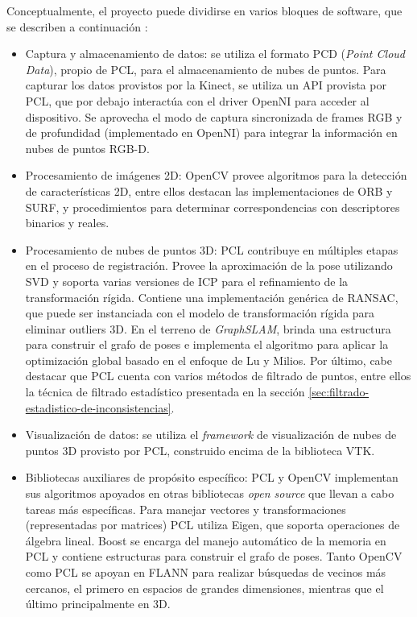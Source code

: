 Conceptualmente, el proyecto puede dividirse en varios bloques de software, que se describen a continuación :
\begin{itemize}

\item Captura y almacenamiento de datos: se utiliza el formato PCD (\textit{Point Cloud Data}), propio de PCL, para el almacenamiento de nubes de puntos. Para capturar los datos provistos por la Kinect, se utiliza un API provista por PCL, que por debajo interactúa con el driver OpenNI para acceder al dispositivo. Se aprovecha el modo de captura sincronizada de frames RGB y de profundidad (implementado en OpenNI) para integrar la información en nubes de puntos RGB-D.

\item Procesamiento de imágenes 2D: OpenCV provee algoritmos para la detección de características 2D, entre ellos destacan las implementaciones de ORB y SURF, y procedimientos para determinar correspondencias con descriptores binarios y reales.

\item Procesamiento de nubes de puntos 3D: PCL contribuye en múltiples etapas en el proceso de registración. Provee la aproximación de la pose utilizando SVD y soporta varias versiones de ICP para el refinamiento de la transformación rígida. Contiene una implementación genérica de RANSAC, que puede ser instanciada con el modelo de transformación rígida para eliminar outliers 3D. En el terreno de \textit{GraphSLAM}, brinda una estructura para construir el grafo de poses e implementa el algoritmo para aplicar la optimización global basado en el enfoque de Lu y Milios. Por último, cabe destacar que PCL cuenta con varios métodos de filtrado de puntos, entre ellos la técnica de filtrado estadístico presentada en la sección \ref{sec:filtrado-estadistico-de-inconsistencias}.

\item Visualización de datos: se utiliza el \textit{framework} de visualización de nubes de puntos 3D provisto por PCL, construido encima de la biblioteca VTK.

\item Bibliotecas auxiliares de propósito específico: PCL y OpenCV implementan sus algoritmos apoyados en otras bibliotecas \textit{open source} que llevan a cabo tareas más específicas. Para manejar vectores y transformaciones (representadas por matrices) PCL utiliza Eigen, que soporta operaciones de álgebra lineal. Boost se encarga del manejo automático de la memoria en PCL y contiene estructuras para construir el grafo de poses. Tanto OpenCV como PCL se apoyan en FLANN para realizar búsquedas de vecinos más cercanos, el primero en espacios de grandes dimensiones, mientras que el último principalmente en 3D.

\end{itemize}

